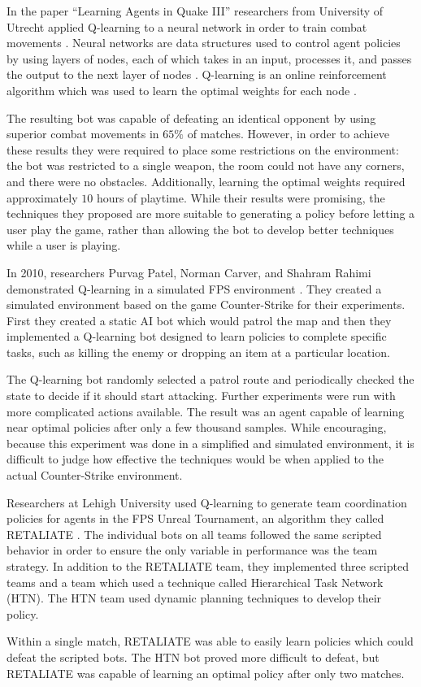 In the paper ``Learning Agents in Quake III'' researchers from University of Utrecht applied Q-learning to a neural network in order to train combat movements \cite{q3combat}. Neural networks are data structures used to control agent policies by using layers of nodes, each of which takes in an input, processes it, and passes the output to the next layer of nodes \cite{norvig}. Q-learning is an online reinforcement algorithm which was used to learn the optimal weights for each node \cite{norvig}.

The resulting bot was capable of defeating an identical opponent by using superior combat movements in $65\%$ of matches. However, in order to achieve these results they were required to place some restrictions on the environment: the bot was restricted to a single weapon, the room could not have any corners, and there were no obstacles. Additionally, learning the optimal weights required approximately $10$ hours of playtime. While their results were promising, the techniques they proposed are more suitable to generating a policy before letting a user play the game, rather than allowing the bot to develop better techniques while a user is playing.

In 2010, researchers Purvag Patel, Norman Carver, and Shahram Rahimi demonstrated Q-learning in a simulated FPS environment \cite{game:ai:learning}. They created a simulated environment based on the game Counter-Strike for their experiments. First they created a static AI bot which would patrol the map and then they implemented a Q-learning bot designed to learn policies to complete specific tasks, such as killing the enemy or dropping an item at a particular location.

The Q-learning bot randomly selected a patrol route and periodically checked the state to decide if it should start attacking. Further experiments were run with more complicated actions available. The result was an agent capable of learning near optimal policies after only a few thousand samples. While encouraging, because this experiment was done in a simplified and simulated environment, it is difficult to judge how effective the techniques would be when applied to the actual Counter-Strike environment.

Researchers at Lehigh University used Q-learning to generate team coordination policies for agents in the FPS Unreal Tournament, an algorithm they called RETALIATE \cite{retaliate}. The individual bots on all teams followed the same scripted behavior in order to ensure the only variable in performance was the team strategy. In addition to the RETALIATE team, they implemented three scripted teams and a team which used a technique called Hierarchical Task Network (HTN). The HTN team used dynamic planning techniques to develop their policy.

Within a single match, RETALIATE was able to easily learn policies which could defeat the scripted bots. The HTN bot proved more difficult to defeat, but RETALIATE was capable of learning an optimal policy after only two matches.
